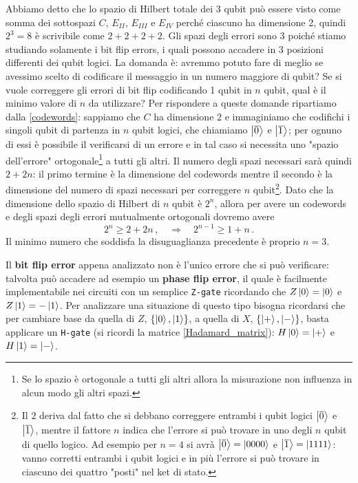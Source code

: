 \noindent Abbiamo detto che lo spazio di Hilbert totale dei 3 qubit può essere visto come somma dei sottospazi $C$, $E_{II}$, $E_{III}$ e $E_{IV}$ perché ciascuno ha dimensione 2, quindi $2^3 = 8$ è scrivibile come $2 + 2 + 2 + 2$. Gli spazi degli errori sono 3 poiché stiamo studiando solamente i bit flip errors, i quali possono accadere in 3 posizioni differenti dei qubit logici. La domanda è: avremmo potuto fare di meglio se avessimo scelto di codificare il messaggio in un numero maggiore di qubit? Se si vuole correggere gli errori di bit flip codificando 1 qubit in $n$ qubit, qual è il minimo valore di $n$ da utilizzare? Per rispondere a queste domande ripartiamo dalla \eqref{codewords}: sappiamo che $C$ ha dimensione 2 e immaginiamo che codifichi i singoli qubit di partenza in $n$ qubit logici, che chiamiamo $\ket{\overline{0}}$ e $\ket{\overline{1}}$; per ognuno di essi è possibile il verificarsi di un errore e in tal caso si necessita uno "spazio dell'errore" ortogonale\footnote{Se lo spazio è ortogonale a tutti gli altri allora la misurazione non influenza in alcun modo gli altri spazi.} a tutti gli altri. Il numero degli spazi necessari sarà quindi $ 2 + 2n$: il primo termine è la dimensione del codewords mentre il secondo è la dimensione del numero di spazi necessari per correggere $n$ qubit\footnote{Il $2$ deriva dal fatto che si debbano correggere entrambi i qubit logici $\ket{\overline{0}}$ e $\ket{\overline{1}}$, mentre il fattore $n$ indica che l'errore si può trovare in uno degli $n$ qubit di quello logico. Ad esempio per $n=4$ si avrà $\ket{\overline{0}} = \ket{0000}$ e $\ket{\overline{1}} = \ket{1111}$: vanno corretti entrambi i qubit logici e in più l'errore si può trovare in ciascuno dei quattro "posti" nel ket di stato.}. Dato che la dimensione dello spazio di Hilbert di $n$ qubit è $2^n$, allora per avere un codewords e degli spazi degli errori mutualmente ortogonali dovremo avere
\begin{equation*}
    2^n \geq 2 + 2 n \, , \quad \Rightarrow \quad 2^{n-1} \geq 1 + n \, .
\end{equation*}
Il minimo numero che soddisfa la disuguaglianza precedente è proprio $n = 3$.

\noindent Il \textbf{bit flip error} appena analizzato non è l'unico errore che si può verificare: talvolta può accadere ad esempio un \textbf{phase flip error}, il quale è facilmente implementabile nei circuiti con un semplice \texttt{Z-gate} ricordando che $Z \ket{0} = \ket{0}$ e $Z \ket{1} = -\ket{1}$. Per analizzare una situazione di questo tipo bisogna ricordarsi che per cambiare base da quella di $Z$, $\{ \ket{0}, \ket{1} \}$, a quella di $X$, $\{ \ket{+}, \ket{-} \}$, basta applicare un \texttt{H-gate} (si ricordi la matrice \eqref{Hadamard_matrix}): $H \ket{0} = \ket{+}$ e $H \ket{1} = \ket{-}$. 

